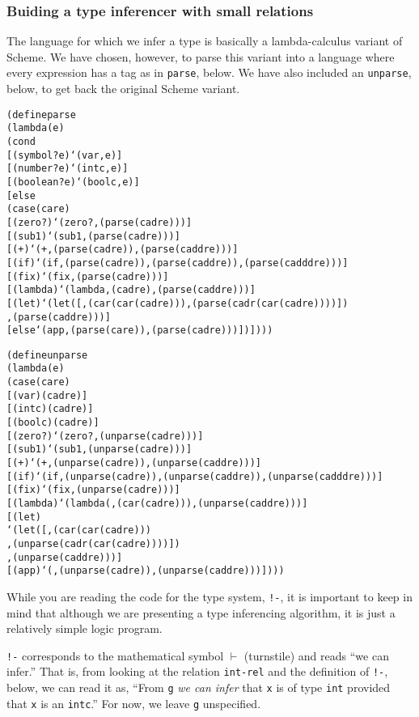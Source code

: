 \subsubsection{Buiding a type inferencer with small relations}

The language for which we infer a type is basically a lambda-calculus
variant of Scheme.  We have chosen, however, to parse this variant
into a language where every expression has a tag as in \texttt{parse},
below.  We have also included an \texttt{unparse}, below, to get back
the original Scheme variant.

\begin{alltt}
(define parse
  (lambda (e)
    (cond
      [(symbol? e) `(var ,e)]
      [(number? e) `(intc ,e)]
      [(boolean? e) `(boolc ,e)]
      [else 
        (case (car e)
          [(zero?) `(zero? ,(parse (cadr e)))]
          [(sub1) `(sub1 ,(parse (cadr e)))]
          [(+) `(+ ,(parse (cadr e)) ,(parse (caddr e)))]
          [(if) `(if ,(parse (cadr e)) ,(parse (caddr e)) ,(parse (cadddr e)))]
          [(fix) `(fix ,(parse (cadr e)))]
          [(lambda) `(lambda ,(cadr e) ,(parse (caddr e)))]
          [(let) `(let ([,(car (car (cadr e))) ,(parse (cadr (car (cadr e))))])
                    ,(parse (caddr e)))]
          [else `(app ,(parse (car e)) ,(parse (cadr e)))])])))
\end{alltt}
\newpage
\begin{alltt}
(define unparse
  (lambda (e)
    (case (car e)
      [(var) (cadr e)]
      [(intc) (cadr e)]
      [(boolc) (cadr e)]
      [(zero?) `(zero? ,(unparse (cadr e)))]
      [(sub1) `(sub1 ,(unparse (cadr e)))]
      [(+) `(+ ,(unparse (cadr e)) ,(unparse (caddr e)))]
      [(if) `(if ,(unparse (cadr e)) ,(unparse (caddr e)) ,(unparse (cadddr e)))]
      [(fix) `(fix ,(unparse (cadr e)))]
      [(lambda) `(lambda (,(car (cadr e))) ,(unparse (caddr e)))]
      [(let) 
       `(let ([,(car (car (cadr e)))
               ,(unparse (cadr (car (cadr e))))])
          ,(unparse (caddr e)))]
      [(app) `(,(unparse (cadr e)) ,(unparse (caddr e)))])))
\end{alltt}

While you are reading the code for the type system, \texttt{!-}, it is
important to keep in mind that although we are presenting a type
inferencing algorithm, it is just a relatively simple logic program.

\texttt{!-} corresponds to the mathematical symbol $\vdash$
(turnstile) and reads ``we can infer.''  That is, from looking at the
relation \texttt{int-rel} and the definition of \texttt{!-}, below, we
can read it as, ``From \texttt{g} \emph{we can infer} that \texttt{x}
is of type \texttt{int} provided that \texttt{x} is an \texttt{intc}.''
For now, we leave \texttt{g} unspecified.

